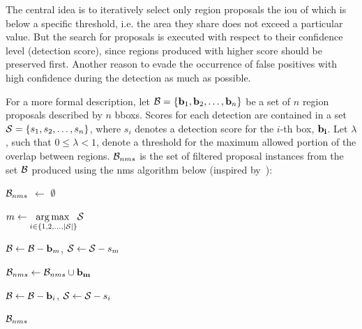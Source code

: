 The central idea is to iteratively select only region proposals the \gls{iou} of which is below a specific threshold, i.e. the area they share does not exceed a particular value. But the search for proposals is executed with respect to their confidence level (detection score), since regions produced with higher score should be preserved first. Another reason to evade the occurrence of false positives with high confidence during the detection as much as possible.

For a more formal description, let $\mathcal{B} = \left\{ {\mathbf{b}_1, \mathbf{b}_2, \dots, \mathbf{b}_n} \right\}$ be a set of $n$ region proposals described by $n$ \glspl{bbox}. Scores for each detection are contained in a set $\mathcal{S} = \left\{ {s_1, s_2, \dots, s_n} \right\}$, where $s_i$ denotes a detection score for the $i$-th box, $\mathbf{b_i}$. Let $\lambda$, such that $0 \leq \lambda < 1$, denote a threshold for the maximum allowed portion of the overlap between regions. $\mathcal{B}_{nms}$ is the set of filtered proposal instances from the set $\mathcal{B}$ produced using the \gls{nms} algorithm below (inspired by~\cite{bodla2017softnms}):

\begin{algorithmic}[1]

    \State $\mathcal{B}_{nms}$ $\gets$ $\emptyset$


    \State $m \gets \underset{i \in \left\{ {1, 2, \dots, \left\vert \mathcal{S} \right\vert} \right\}}{\operatorname*{arg\,max}{}} \mathcal{S}$

    \State $\mathcal{B} \gets \mathcal{B} - \mathbf{b}_m$, $\mathcal{S} \gets \mathcal{S} - s_m$

    \State $\mathcal{B}_{nms} \gets \mathcal{B}_{nms} \cup \mathbf{b_m}$



    \State $\mathcal{B} \gets \mathcal{B} - \mathbf{b}_i$, $\mathcal{S} \gets \mathcal{S} - s_i$
    \EndIf
    \EndFor
    \EndWhile

    \State \Return $\mathcal{B}_{nms}$
    \EndFunction
\end{algorithmic}

